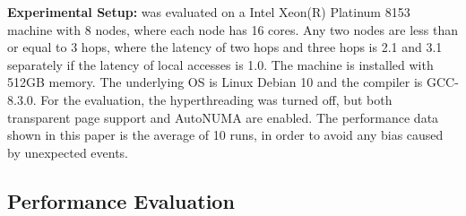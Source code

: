 \textbf{Experimental Setup:}  \NM{} was evaluated on a Intel Xeon(R) Platinum 8153 machine with 8 nodes, where each node has 16 cores. Any two nodes are less than or equal to 3 hops, where the latency of two hops and three hops is 2.1 and 3.1 separately if the latency of local accesses is 1.0. The machine is installed with 512GB memory. The underlying OS is Linux Debian 10 and the compiler is GCC-8.3.0. For the evaluation, the hyperthreading was turned off, but both transparent page support and AutoNUMA are  enabled. The performance data shown in this paper is the average of 10 runs, in order to avoid any bias caused by unexpected events.  

\subsection{Performance Evaluation}

